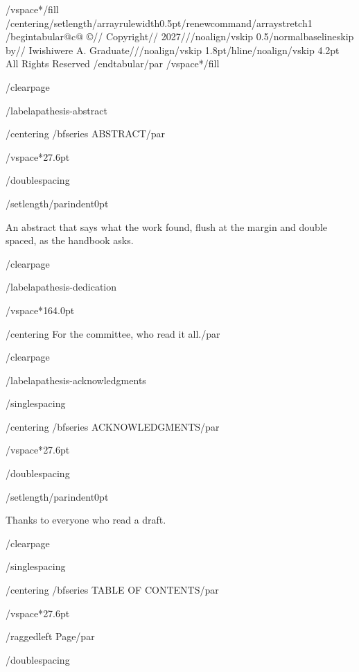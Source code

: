 /vspace*{/fill}
{/centering/setlength{/arrayrulewidth}{0.5pt}/renewcommand{/arraystretch}{1}
/begin{tabular}{@{}c@{}}
©//
Copyright//
2027///noalign{/vskip 0.5/normalbaselineskip}
by//
Iwishiwere A. Graduate///noalign{/vskip 1.8pt}/hline/noalign{/vskip 4.2pt}
All Rights Reserved
/end{tabular}/par}
/vspace*{/fill}

/clearpage

/label{apathesis-abstract}

{/centering
/bfseries ABSTRACT/par}

/vspace*{27.6pt}

/doublespacing

{/setlength{/parindent}{0pt}

An abstract that says what the work found, flush at the margin and
double spaced, as the handbook asks.

}

/clearpage

/label{apathesis-dedication}

/vspace*{164.0pt}

{/centering
For the committee, who read it all./par}

/clearpage

/label{apathesis-acknowledgments}

/singlespacing

{/centering
/bfseries ACKNOWLEDGMENTS/par}

/vspace*{27.6pt}

/doublespacing

{/setlength{/parindent}{0pt}

Thanks to everyone who read a draft.

}

/clearpage

/singlespacing

{/centering
/bfseries TABLE OF CONTENTS/par}

/vspace*{27.6pt}

{/raggedleft
Page/par}

/doublespacing

